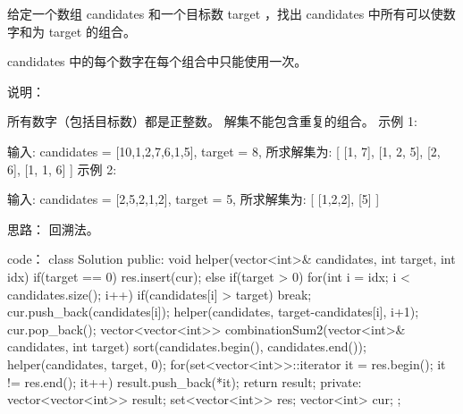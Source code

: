 给定一个数组 candidates 和一个目标数 target ，找出 candidates 中所有可以使数字和为 target 的组合。

candidates 中的每个数字在每个组合中只能使用一次。

说明：

所有数字（包括目标数）都是正整数。
解集不能包含重复的组合。 
示例 1:

输入: candidates = [10,1,2,7,6,1,5], target = 8,
所求解集为:
[
  [1, 7],
  [1, 2, 5],
  [2, 6],
  [1, 1, 6]
]
示例 2:

输入: candidates = [2,5,2,1,2], target = 5,
所求解集为:
[
  [1,2,2],
  [5]
]




























思路：
回溯法。

































code：
class Solution {
public:
    void helper(vector<int>& candidates, int target, int idx)
    {
        if(target == 0) res.insert(cur);
        else if(target > 0)
        {
            for(int i = idx; i < candidates.size(); i++)
            {
                if(candidates[i] > target) break;
                cur.push_back(candidates[i]);
                helper(candidates, target-candidates[i], i+1);
                cur.pop_back();
            }
        }
    }
    vector<vector<int>> combinationSum2(vector<int>& candidates, int target) {
        sort(candidates.begin(), candidates.end());
        helper(candidates, target, 0);
        for(set<vector<int>>::iterator it = res.begin(); it != res.end(); it++)
            result.push_back(*it);
        return result;
    }
private:
    vector<vector<int>> result;
    set<vector<int>> res;
    vector<int> cur;
};


